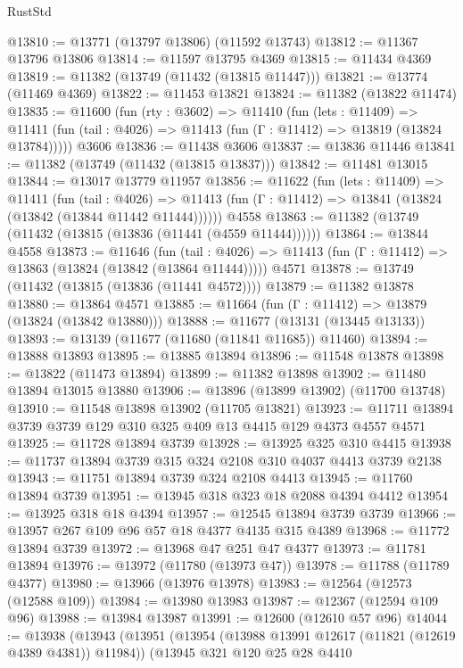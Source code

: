 \begin{lexlean}{RustStd}
\begin{coremodule}
@13810 := @13771 (@13797 @13806) (@11592 @13743)
@13812 := @11367 @13796 @13806
@13814 := @11597 @13795 @4369
@13815 := @11434 @4369
@13819 := @11382 (@13749 (@11432 (@13815 @11447)))
@13821 := @13774 (@11469 @4369)
@13822 := @11453 @13821
@13824 := @11382 (@13822 @11474)
@13835 := @11600
    (fun (rty : @3602) =>
    @11410
      (fun (lets : @11409) =>
      @11411 (fun (tail : @4026) => @11413 (fun (Γ : @11412) => @13819 (@13824 @13784)))))
    @3606
@13836 := @11438 @3606
@13837 := @13836 @11446
@13841 := @11382 (@13749 (@11432 (@13815 @13837)))
@13842 := @11481 @13015
@13844 := @13017 @13779 @11957
@13856 := @11622
    (fun (lets : @11409) =>
    @11411
      (fun (tail : @4026) =>
      @11413 (fun (Γ : @11412) => @13841 (@13824 (@13842 (@13844 @11442 @11444))))))
    @4558
@13863 := @11382 (@13749 (@11432 (@13815 (@13836 (@11441 (@4559 @11444))))))
@13864 := @13844 @4558
@13873 := @11646
    (fun (tail : @4026) => @11413 (fun (Γ : @11412) => @13863 (@13824 (@13842 (@13864 @11444)))))
    @4571
@13878 := @13749 (@11432 (@13815 (@13836 (@11441 @4572))))
@13879 := @11382 @13878
@13880 := @13864 @4571
@13885 := @11664 (fun (Γ : @11412) => @13879 (@13824 (@13842 @13880)))
@13888 := @11677 (@13131 (@13445 @13133))
@13893 := @13139 (@11677 (@11680 (@11841 @11685)) @11460)
@13894 := @13888 @13893
@13895 := @13885 @13894
@13896 := @11548 @13878
@13898 := @13822 (@11473 @13894)
@13899 := @11382 @13898
@13902 := @11480 @13894 @13015 @13880
@13906 := @13896 (@13899 @13902) (@11700 @13748)
@13910 := @11548 @13898 @13902 (@11705 @13821)
@13923 := @11711 @13894 @3739 @3739 @129 @310 @325 @409 @13 @4415 @129 @4373 @4557 @4571
@13925 := @11728 @13894 @3739
@13928 := @13925 @325 @310 @4415
@13938 := @11737 @13894 @3739 @315 @324 @2108 @310 @4037 @4413 @3739 @2138
@13943 := @11751 @13894 @3739 @324 @2108 @4413
@13945 := @11760 @13894 @3739
@13951 := @13945 @318 @323 @18 @2088 @4394 @4412
@13954 := @13925 @318 @18 @4394
@13957 := @12545 @13894 @3739 @3739
@13966 := @13957 @267 @109 @96 @57 @18 @4377 @4135 @315 @4389
@13968 := @11772 @13894 @3739
@13972 := @13968 @47 @251 @47 @4377
@13973 := @11781 @13894
@13976 := @13972 (@11780 (@13973 @47))
@13978 := @11788 (@11789 @4377)
@13980 := @13966 (@13976 @13978)
@13983 := @12564 (@12573 (@12588 @109))
@13984 := @13980 @13983
@13987 := @12367 (@12594 @109 @96)
@13988 := @13984 @13987
@13991 := @12600 (@12610 @57 @96)
@14044 := @13938
    (@13943
      (@13951
        (@13954 (@13988 @13991 @12617 (@11821 (@12619 @4389 @4381)) @11984))
        (@13945
          @321
          @120
          @25
          @28
          @4410

\end{coremodule}
\end{lexlean}
